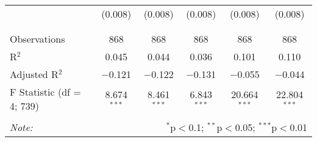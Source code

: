 \begin{table}[!htbp]
\begin{tabular}{@{\extracolsep{5pt}}lccccc}
  & (0.008) & (0.008) & (0.008) & (0.008) & (0.008) \\ 
  & & & & & \\ 
\hline \\[-1.8ex] 
Observations & 868 & 868 & 868 & 868 & 868 \\ 
R$^{2}$ & 0.045 & 0.044 & 0.036 & 0.101 & 0.110 \\ 
Adjusted R$^{2}$ & $-$0.121 & $-$0.122 & $-$0.131 & $-$0.055 & $-$0.044 \\ 
F Statistic (df = 4; 739) & 8.674$^{***}$ & 8.461$^{***}$ & 6.843$^{***}$ & 20.664$^{***}$ & 22.804$^{***}$ \\ 
\hline 
\hline \\[-1.8ex] 
\textit{Note:}  & \multicolumn{5}{r}{$^{*}$p$<$0.1; $^{**}$p$<$0.05; $^{***}$p$<$0.01} \\ 
\end{tabular} 
\end{table} 
